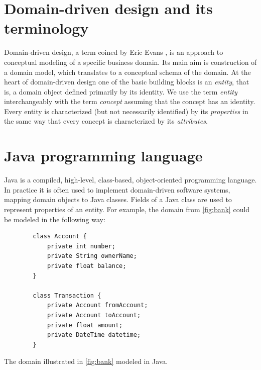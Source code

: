 %

\section{Domain-driven design and its terminology}
Domain-driven design, a term coined by Eric Evans \cite{ddd}, is an approach to conceptual modeling of a specific business domain.
Its main aim is construction of a domain model, which translates to a conceptual schema of the domain.
At the heart of domain-driven design one of the basic building blocks is an \textit{entity}, that is, a domain object defined primarily by its identity.
We use the term \textit{entity} interchangeably with the term \textit{concept} assuming that the concept has an identity. 
Every entity is characterized (but not necessarily identified) by its \textit{properties} in the same way that every concept is characterized by its \textit{attributes}.

\section{Java programming language}
Java \cite{java} is a compiled, high-level, class-based, object-oriented programming language.
In practice it is often used to implement domain-driven software systems, mapping domain objects to Java classes.
Fields of a Java class are used to represent properties of an entity.
For example, the domain from \ref{fig:bank} could be modeled in the following way:

\begin{listing}[H]
    \begin{verbatim}
        class Account {
            private int number;
            private String ownerName;
            private float balance;
        }

        class Transaction {
            private Account fromAccount;
            private Account toAccount;
            private float amount;
            private DateTime datetime;
        }
    \end{verbatim}
    \caption{The domain illustrated in \ref{fig:bank} modeled in Java.}
    \label{lst:bank}
\end{listing}


